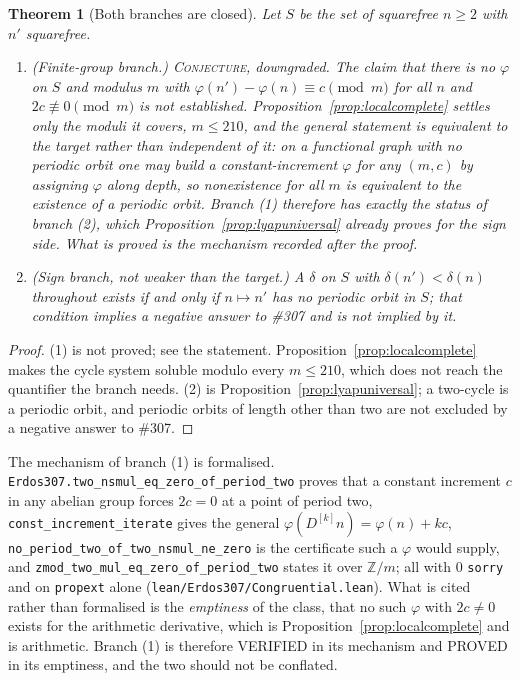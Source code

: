 \documentclass[11pt]{article}
\newtheorem{theorem}{Theorem}[section]
\theoremstyle{definition}
\begin{document}
\begin{theorem}[Both branches are closed]\label{thm:noinvariant}
Let $S$ be the set of squarefree $n\ge2$ with $n'$ squarefree.
\begin{enumerate}[label=\textup{(\arabic*)},leftmargin=2.2em]
\item \textup{(Finite-group branch.)} \textsc{Conjecture}, downgraded. The claim that there is no
$\varphi$ on $S$ and modulus $m$ with $\varphi(n')-\varphi(n)\equiv c\pmod m$ for all $n$ and
$2c\not\equiv0\pmod m$ is \emph{not} established. Proposition~\ref{prop:localcomplete} settles only
the moduli it covers, $m\le210$, and the general statement is equivalent to the target rather than
independent of it: on a functional graph with no periodic orbit one may build a constant-increment
$\varphi$ for any $(m,c)$ by assigning $\varphi$ along depth, so nonexistence for all $m$ is
equivalent to the existence of a periodic orbit. Branch (1) therefore has exactly the status of
branch (2), which Proposition~\ref{prop:lyapuniversal} already proves for the sign side. What is
proved is the mechanism recorded after the proof.
\item \textup{(Sign branch, not weaker than the target.)} A $\delta$ on $S$ with
$\delta(n')<\delta(n)$ throughout exists if and only if $n\mapsto n'$ has no periodic orbit in $S$;
that condition implies a negative answer to \#307 and is not implied by it.
\end{enumerate}
\end{theorem}
\begin{proof}
(1) is not proved; see the statement. Proposition~\ref{prop:localcomplete} makes the cycle system
soluble modulo every $m\le210$, which does not reach the quantifier the branch needs.
(2) is Proposition~\ref{prop:lyapuniversal}; a two-cycle is a periodic orbit, and periodic orbits of
length other than two are not excluded by a negative answer to \#307.
\end{proof}

The mechanism of branch (1) is formalised. \texttt{Erdos307.two\_nsmul\_eq\_zero\_of\_period\_two}
proves that a constant increment $c$ in any abelian group forces $2c=0$ at a point of period two,
\texttt{const\_increment\_iterate} gives the general $\varphi(D^{[k]}n)=\varphi(n)+kc$,
\texttt{no\_period\_two\_of\_two\_nsmul\_ne\_zero} is the certificate such a $\varphi$ would supply,
and \texttt{zmod\_two\_mul\_eq\_zero\_of\_period\_two} states it over $\mathbb{Z}/m$; all with $0$
\texttt{sorry} and on \texttt{propext} alone
\textup{(\texttt{lean/Erdos307/Congruential.lean})}. What is cited rather than formalised is the
\emph{emptiness} of the class, that no such $\varphi$ with $2c\neq0$ exists for the arithmetic
derivative, which is Proposition~\ref{prop:localcomplete} and is arithmetic. Branch (1) is therefore
\textup{VERIFIED} in its mechanism and \textup{PROVED} in its emptiness, and the two should not be
conflated.
\end{document}
